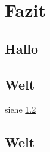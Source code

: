 \chapter{Fazit}
\section{Hallo}\label{sec:hallo}

\blindtext[20]


\section{Welt}\label{sec:hallo}


siehe \ref{sec:hallo}


\blindtext[20]


\section{Welt}

\blindtext[20]

